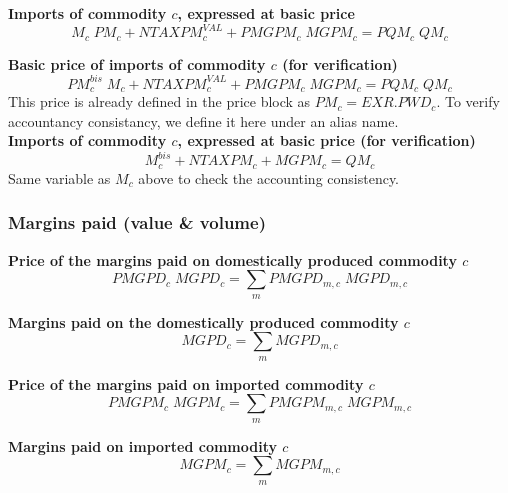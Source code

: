 \documentclass[12pt]{article}
\numberwithin{equation}{section}
\begin{document}
\noindent\textbf{Imports of commodity $c$, expressed at basic price} \\
\begin{dmath}
M_{c} \; PM_{c} + NTAXPM^{VAL}_{c} + PMGPM_{c} \; MGPM_{c} = PQM_{c} \; QM_{c}
\end{dmath}

\noindent\textbf{Basic price of imports of commodity $c$ (for verification)} \\
\begin{dmath}
PM^{bis}_{c} \; M_{c} + NTAXPM^{VAL}_{c} + PMGPM_{c} \; MGPM_{c} = PQM_{c} \; QM_{c}
\end{dmath}
 This price is already defined in the price block as $PM_{c} = EXR . PWD_{c}$. To verify accountancy consistancy, we define it here under an alias name. \\

\noindent\textbf{Imports of commodity $c$, expressed at basic price (for verification)} \\
\begin{dmath}
M^{bis}_{c} + NTAXPM_{c} + MGPM_{c} = QM_{c}
\end{dmath}
Same variable as $M_{c}$ above to check the accounting consistency. \\



\subsubsection{Margins paid (value \& volume)}


\noindent\textbf{Price of the margins paid on domestically produced commodity $c$} \\
\begin{dmath}
PMGPD_{c} \; MGPD_{c} = \sum_{m} PMGPD_{m, c} \; MGPD_{m, c}
\end{dmath}

\noindent\textbf{Margins paid on the domestically produced commodity $c$} \\
\begin{dmath}
MGPD_{c} = \sum_{m} MGPD_{m, c}
\end{dmath}

\noindent\textbf{Price of the margins paid on imported commodity $c$} \\
\begin{dmath}
PMGPM_{c} \; MGPM_{c} = \sum_{m} PMGPM_{m, c} \; MGPM_{m, c}
\end{dmath}

\noindent\textbf{Margins paid on imported commodity $c$} \\
\begin{dmath}
MGPM_{c} = \sum_{m} MGPM_{m, c}
\end{dmath}
\end{document}
